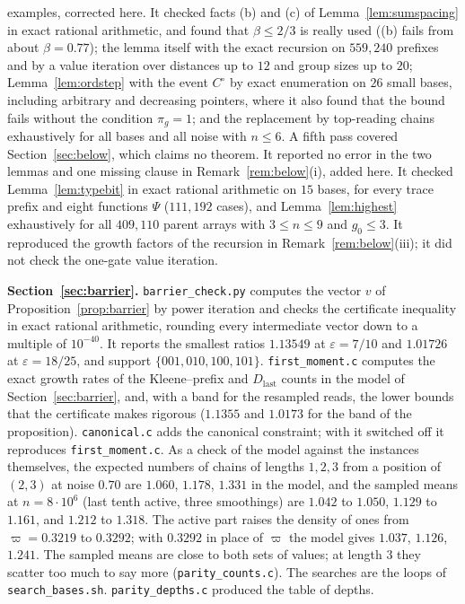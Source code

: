 \documentclass[11pt]{amsart}
\theoremstyle{definition}
\theoremstyle{remark}
\newcommand{\eps}{\varepsilon}
\begin{document}
examples, corrected here. It checked facts (b) and (c) of Lemma~\ref{lem:sumspacing} in exact
rational arithmetic, and found that $\beta\le2/3$ is really used ((b) fails from about
$\beta=0.77$); the lemma itself with the exact recursion on $559{,}240$ prefixes and by a value
iteration over distances up to $12$ and group sizes up to $20$; Lemma~\ref{lem:ordstep} with the
event $C^\circ$ by exact enumeration on $26$ small bases, including arbitrary and decreasing
pointers, where it also found that the bound fails without the condition $\pi_g=1$; and the
replacement by top-reading chains exhaustively for all bases and all noise with $n\le6$.
A fifth pass covered Section~\ref{sec:below}, which claims no theorem. It reported no error in
the two lemmas and one missing clause in Remark~\ref{rem:below}(i), added here. It checked
Lemma~\ref{lem:typebit} in exact rational arithmetic on $15$ bases, for every trace prefix and
eight functions $\Psi$ ($111{,}192$ cases), and Lemma~\ref{lem:highest} exhaustively for all
$409{,}110$ parent arrays with $3\le n\le9$ and $g_0\le3$. It reproduced the growth factors of the
recursion in Remark~\ref{rem:below}(iii); it did not check the one-gate value iteration.

\medskip\noindent\textbf{Section~\ref{sec:barrier}.} \texttt{barrier\_check.py} computes the vector
$v$ of Proposition~\ref{prop:barrier} by power iteration and checks the certificate inequality in
exact rational arithmetic, rounding every intermediate vector down to a multiple of $10^{-40}$.
It reports the smallest ratios $1.13549$ at $\eps=7/10$ and $1.01726$ at $\eps=18/25$, and
support $\{001,010,100,101\}$. \texttt{first\_moment.c} computes the exact growth rates of the
Kleene--prefix and $D_{\mathrm{last}}$ counts in the model of Section~\ref{sec:barrier}, and, with a
band for the resampled reads, the lower bounds that the certificate makes rigorous ($1.1355$ and
$1.0173$ for the band of the proposition). \texttt{canonical.c} adds the canonical constraint;
with it switched off it reproduces \texttt{first\_moment.c}. As a check of the model against the
instances themselves, the expected numbers of chains of lengths $1,2,3$ from a position of
$(2,3)$ at noise $0.70$ are $1.060$, $1.178$, $1.331$ in the model, and the sampled means at
$n=8\cdot10^6$ (last tenth active, three smoothings) are $1.042$ to $1.050$, $1.129$ to $1.161$, and
$1.212$ to $1.318$. The active part raises the density of ones from $\varpi=0.3219$ to $0.3292$;
with $0.3292$ in place of $\varpi$ the model gives $1.037$, $1.126$, $1.241$. The sampled means
are close to both sets of values; at length $3$ they scatter too much to say more
(\texttt{parity\_counts.c}). The searches are the loops of \texttt{search\_bases.sh}. \texttt{parity\_depths.c} produced the table of depths.
\end{document}
